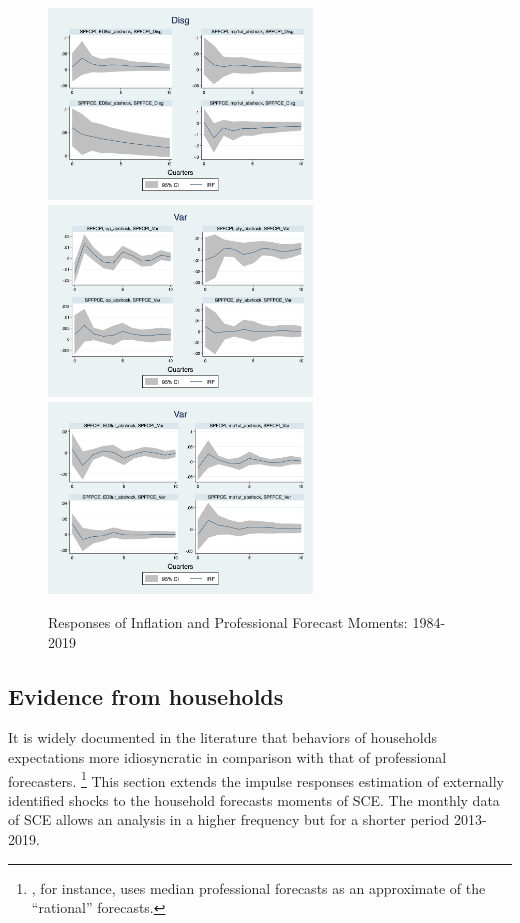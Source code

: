 \documentclass[]{article}
\begin{document}
\begin{figure}[ht]
		\includegraphics[width=7cm]{figures/SPFDisg_ab_ashocks.png} \\
		\smallskip 
		\includegraphics[width=7cm]{figures/SPFVar_ab_ashocks_nmp.png} 
		\includegraphics[width=7cm]{figures/SPFVar_ab_ashocks.png} 
		\caption{Responses of Inflation and Professional Forecast Moments: 1984-2019}
		\label{ReplicateCoibionwholeperiod}
	\end{figure}
	
	
	\subsection{Evidence from households}
	
	It is widely documented in the literature that behaviors of households expectations more idiosyncratic in comparison with that of professional forecasters. \footnote{\cite{carroll2003macroeconomic}, for instance, uses median professional forecasts as an approximate of the ``rational'' forecasts.} This section extends the impulse responses estimation of externally identified shocks to the household forecasts moments of SCE.  The monthly data of SCE allows an analysis in a higher frequency but for a shorter period 2013-2019. 
	
\end{document}
